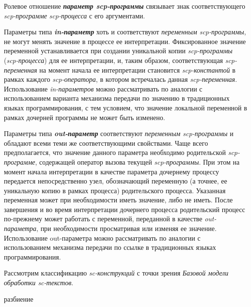 Ролевое отношение \textbf{\textit{параметр scp-программы\scnrolesign}} связывает знак соответствующего \textit{scp-программе} \textit{\mbox{scp-процесса}} с его аргументами.

Параметры типа \textbf{\textit{in-параметр\scnrolesign}} хоть и соответствуют \textit{переменным scp-программы\scnrolesign}, не могут менять значение в процессе ее интерпретации. Фиксированное значение переменной устанавливается при создании уникальной копии \textit{scp-программы} (\textit{scp-процесса}) для ее интерпретации, и, таким образом, соответствующая \textit{scp-переменная\scnrolesign} на момент начала ее интерпретации становится \textit{scp-константой\scnrolesign} в рамках каждого \textit{scp-оператора}, в котором встречалась данная \textit{scp-переменная\scnrolesign}. Использование \textit{in-параметров} можно рассматривать по аналогии с использованием варианта механизма передачи по значению в традиционных языках программирования, с тем условием, что значение локальной переменной в рамках дочерней программы не может быть изменено.

Параметры типа \textbf{\textit{out-параметр\scnrolesign}} соответствуют \textit{переменным scp-программы\scnrolesign} и обладают всеми теми же соответствующими свойствами. Чаще всего предполагается, что значение данного параметра необходимо родительской \textit{scp-программе}, содержащей оператор вызова текущей \textit{scp-программы}. При этом на момент начала интерпретации в качестве параметра дочернему процессу передается непосредственно узел, обозначающий переменную (а точнее, ее уникальную копию в рамках процесса) родительского процесса. Указанная переменная может при необходимости иметь значение, либо не иметь. После завершения и во время интерпретации дочернего процесса родительский процесс по-прежнему может работать с переменной, переданной в качестве \textit{out-параметра\scnrolesign}, при необходимости просматривая или изменяя ее значение. Использование out-параметра можно рассматривать по аналогии с использованием механизма передачи по ссылке в традиционных языках программирования.

Рассмотрим классификацию \textit{sc-конструкций} с точки зрения \textit{Базовой модели обработки sc-текстов}.

\begin{SCn}
\begin{scnindent}
	\begin{scneqtoset}
	\end{scneqtoset}
\begin{scnindent}
\begin{scnrelfromset}{разбиение}
\end{scnrelfromset}
\end{scnindent}
\end{scnindent}
\end{SCn}

